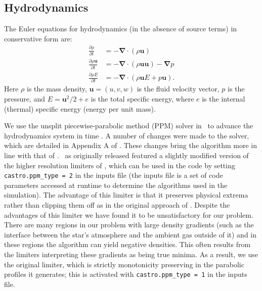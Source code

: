 \documentclass[12pt]{article}
\begin{document}
\subsection{Hydrodynamics}
\label{sec:hydrodynamics}

The Euler equations for hydrodynamics (in the absence of source terms) in conservative form are: 
\begin{align}
  \frac{\partial \rho}{\partial t} &= -\bm{\nabla} \cdot (\rho \mathbf{u}) \label{eq:euler_density}\\
  \frac{\partial \rho \mathbf{u}}{\partial t} &= -\bm{\nabla} \cdot (\rho \mathbf{u}\mathbf{u}) - \bm{\nabla}p \label{eq:euler_momentum}\\
  \frac{\partial \rho E}{\partial t} &= -\bm{\nabla}\cdot(\rho\mathbf{u}E + p\mathbf{u}). \label{eq:euler_energy}
\end{align}
Here $\rho$ is the mass density, $\mathbf{u} = (u, v, w)$ is the fluid velocity
vector, $p$ is the pressure, and $E = \mathbf{u}^2 / 2 + e$ is the
total specific energy, where $e$ is the internal (thermal) specific
energy (energy per unit mass).

We use the unsplit piecewise-parabolic method (PPM) solver in \castro\
to advance the hydrodynamics system in time \citep{ppmunsplit}.  A
number of changes were made to the solver, which are detailed in Appendix A
of \cite{wdmergerI}.
These changes bring the algorithm more in line with that of
\cite{ppm}. \castro\ as originally released featured a slightly modified
version of the higher resolution limiters of
\cite{colella-sekora:2008}, which can be used in the code by setting 
\texttt{castro.ppm\_type = 2} in the inputs file (the inputs file is
a set of code parameters accessed at runtime to determine the algorithms
used in the simulation). The advantage of this limiter is that
it preserves physical extrema rather than clipping them off as in the
original approach of \cite{ppm}. Despite the advantages of this limiter 
we have found it to be unsatisfactory for our problem. There are many regions in our
problem with large density gradients (such as the interface between
the star's atmosphere and the ambient gas outside of it) and in these
regions the algorithm can yield negative densities. This often results
from the limiters interpreting these gradients as being true
minima. As a result, we use the original limiter, which is strictly
monotonicity preserving in the parabolic profiles it generates; this
is activated with \texttt{castro.ppm\_type = 1} in the inputs file.
\end{document}
